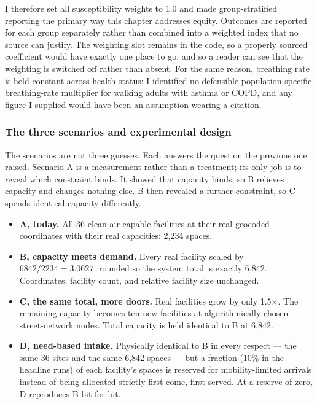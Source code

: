 \documentclass[graybox]{svmult}
\begin{document}
I therefore set all susceptibility weights to 1.0 and made group-stratified
reporting the primary way this chapter addresses equity. Outcomes are reported
for each group separately rather than combined into a weighted index that no
source can justify. The weighting slot remains in the code, so a properly sourced
coefficient would have exactly one place to go, and so a reader can see that the
weighting is switched off rather than absent. For the same reason, breathing rate
is held constant across health status: I identified no defensible
population-specific breathing-rate multiplier for walking adults with asthma or
COPD, and any figure I supplied would have been an assumption wearing a citation.

\subsubsection{The three scenarios and experimental design}
\label{sec:scenarios}

The scenarios are not three guesses. Each answers the question the previous one
raised. Scenario A is a measurement rather than a treatment; its only job is to
reveal which constraint binds. It showed that capacity binds, so B relieves
capacity and changes nothing else. B then revealed a further constraint, so C
spends identical capacity differently.

\begin{itemize}
\item \textbf{A, today.} All 36 clean-air-capable facilities at their real
geocoded coordinates with their real capacities: 2,234 spaces.
\item \textbf{B, capacity meets demand.} Every real facility scaled by
$6842/2234 = 3.0627$, rounded so the system total is exactly 6,842. Coordinates,
facility count, and relative facility size unchanged.
\item \textbf{C, the same total, more doors.} Real facilities grow by only
1.5$\times$. The remaining capacity becomes ten new facilities at algorithmically
chosen street-network nodes. Total capacity is held identical to B at 6,842.
\item \textbf{D, need-based intake.} Physically identical to B in every respect
--- the same 36 sites and the same 6,842 spaces --- but a fraction (10\% in the
headline runs) of each facility's spaces is reserved for mobility-limited
arrivals instead of being allocated strictly first-come, first-served. At a
reserve of zero, D reproduces B bit for bit.
\end{itemize}
\end{document}
